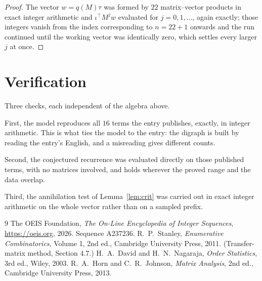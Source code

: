 \documentclass[11pt,a4paper]{article}
\theoremstyle{plain}
\theoremstyle{definition}
\begin{document}
\begin{proof}
The vector $w=q(M)\tau$ was formed by $22$ matrix--vector products in exact integer
arithmetic and $\iota^{\!\top}M^{j}w$ evaluated for $j=0,1,\dots$, again exactly; those
integers vanish from the index corresponding to $n=22+1$ onwards and the run continued
until the working vector was identically zero, which settles every larger $j$ at once.
\end{proof}

\section{Verification}

Three checks, each independent of the algebra above.

First, the model reproduces all $16$ terms the entry publishes, exactly, in integer
arithmetic. This is what ties the model to the entry: the digraph is built by reading the
entry's English, and a misreading gives different counts.

Second, the conjectured recurrence was evaluated directly on those published terms, with no
matrices involved, and holds wherever the proved range and the data overlap.

Third, the annihilation test of Lemma~\ref{lem:crit} was carried out in exact integer
arithmetic on the whole vector rather than on a sampled prefix.

\begin{thebibliography}{9}
 The OEIS Foundation, \emph{The On-Line Encyclopedia of Integer
Sequences}, \url{https://oeis.org}, 2026. Sequence A237236.
 R.~P.~Stanley, \emph{Enumerative Combinatorics}, Volume 1, 2nd ed.,
Cambridge University Press, 2011. (Transfer-matrix method, Section 4.7.)
 H.~A.~David and H.~N.~Nagaraja, \emph{Order Statistics}, 3rd ed., Wiley,
2003.
 R.~A.~Horn and C.~R.~Johnson, \emph{Matrix Analysis}, 2nd ed., Cambridge
University Press, 2013.
\end{thebibliography}
\end{document}
